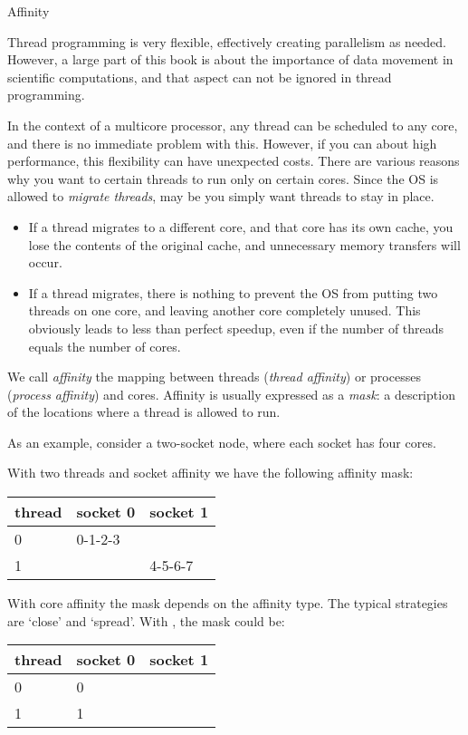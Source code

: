  {Affinity}

Thread programming is very flexible, effectively creating parallelism
as needed. However, a large part of this book is about the importance
of data movement in scientific computations, and that aspect can not
be ignored in thread programming.

In the context of a multicore processor, any thread can be scheduled
to any core, and there is no immediate problem with this. However, if
you can about high performance, this flexibility can have unexpected
costs. There are various reasons why you want to certain threads to
run only on certain cores. Since the \ac{OS} is allowed to
\emph{migrate threads}, may be you simply want
threads to stay in place.

\begin{itemize}
\item If a thread migrates to a different core, and that core has its
  own cache, you lose the contents of the original cache, and
  unnecessary memory transfers will occur.
\item If a thread migrates, there is nothing to prevent the OS from
  putting two threads on one core, and leaving another core completely
  unused. This obviously leads to less than perfect speedup, even if
  the number of threads equals the number of cores.
\end{itemize}

We call \emph{affinity} the mapping between
threads (\emph{thread affinity})
or processes (\emph{process
  affinity}) and cores.
Affinity is usually expressed as a \emph{mask}: a
description of the locations where a thread is allowed to run.

As an example, consider a two-socket node, where each socket has four
cores.

With two threads and socket affinity we have the following affinity mask:\\
\begin{tabular}{|l|l|l|}
  \hline
  thread & socket 0 & socket 1\\
  \hline \hline
  0 & 0-1-2-3 & \\
  1 & & 4-5-6-7 \\
  \hline
\end{tabular}

With core affinity the mask depends on the affinity type. The typical
strategies are `close' and `spread'. With , the mask
could be:\\
\begin{tabular}{|l|l|l|}
  \hline
  thread & socket 0 & socket 1\\
  \hline \hline
  0 & 0 & \\
  1 & \hphantom{0-}1 & \\
  \hline
\end{tabular}


